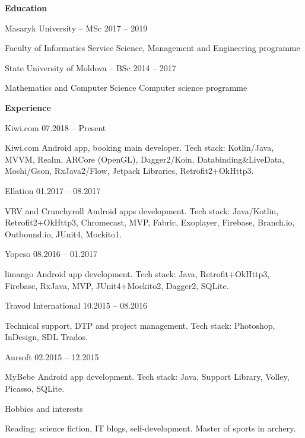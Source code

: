 \documentclass[12pt, a4paper]{article}
\newcommand{\headlineSix}[1]{{\Large #1}}
\newcommand{\sectionTitle}[2]{
    \bigskip 
    \raisebox{-.15\height}{} 
    \hspace{4pt} 
    \headlineSix{\textbf{#1}} 
    \bigskip
}
\newcommand{\subsectionTitle}[1]{\bigskip #1 \bigskip}
\begin{document}
\begin{minipage}[t]{0.6\textwidth}
    \sectionTitle{Education}{icon_school}
    
    \subsectionTitle{Masaryk University – MSc} \hfill 2017 – 2019
    
    Faculty of Informatics \newline
    Service Science, Management and Engineering programme
    
    \subsectionTitle{State University of Moldova – BSc} \hfill 2014 – 2017
    
    Mathematics and Computer Science \newline
    Computer science programme
    
    \sectionTitle{Experience}{icon_work}
    
    \subsectionTitle{Kiwi.com} \hfill 07.2018 – Present
    
    Kiwi.com Android app, booking main developer. \newline
    Tech stack: Kotlin/Java, MVVM, Realm, ARCore (OpenGL), \newline
    Dagger2/Koin, Databinding\&LiveData, Moshi/Gson, \newline
    RxJava2/Flow, Jetpack Libraries, Retrofit2+OkHttp3.
    
    \subsectionTitle{Ellation} \hfill 01.2017 – 08.2017
    
    VRV and Crunchyroll Android apps development.
    Tech stack: Java/Kotlin, Retrofit2+OkHttp3, Chromecast, MVP, Fabric, Exoplayer, Firebase, Branch.io, Outbound.io, JUnit4, Mockito1.
   
    \subsectionTitle{Yopeso} \hfill 08.2016 – 01.2017
    
    limango Android app development. \newline
    Tech stack: Java, Retrofit+OkHttp3, Firebase, RxJava, MVP, \newline
    JUnit4+Mockito2, Dagger2, SQLite.
    
    \subsectionTitle{Travod International} \hfill 10.2015 – 08.2016
    
    Technical support, DTP and project management. \newline
    Tech stack: Photoshop, InDesign, SDL Trados.
    
    \subsectionTitle{Aursoft} \hfill 02.2015 – 12.2015
    
    MyBebe Android app development. \newline
    Tech stack: Java, Support Library, Volley, Picasso, SQLite.

    \subsectionTitle{Hobbies and interests}
    
    Reading: science fiction, IT blogs, self-development. Master of sports in archery.
\end{minipage}\\
\end{document}
